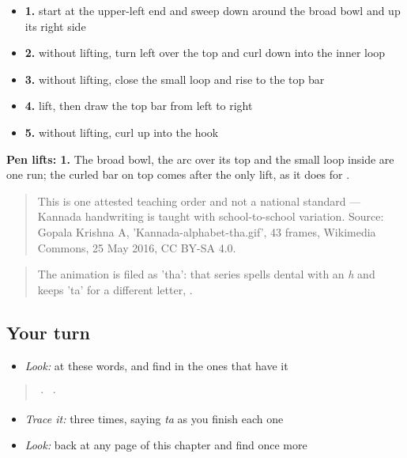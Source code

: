 \begin{itemize}
\raggedright
  \item \textbf{1.} start at the upper-left end and sweep down around the broad bowl and up its right side
  \item \textbf{2.} without lifting, turn left over the top and curl down into the inner loop
  \item \textbf{3.} without lifting, close the small loop and rise to the top bar
  \item \textbf{4.} lift, then draw the top bar from left to right
  \item \textbf{5.} without lifting, curl up into the hook
\end{itemize}

\textbf{Pen lifts: 1.} The broad bowl, the arc over its top and the small loop inside are one run; the curled bar on top comes after the only lift, as it does for .

\begin{quote}
This is one attested teaching order and not a national standard — Kannada handwriting is taught with school-to-school variation. Source: Gopala Krishna A, 'Kannada-alphabet-tha.gif', 43 frames, Wikimedia Commons, 25 May 2016, CC BY-SA 4.0.
\end{quote}

\begin{quote}
The animation is filed as 'tha': that series spells dental  with an \emph{h} and keeps 'ta' for a different letter, .
\end{quote}

\subsection*{Your turn}
\begin{itemize}
\raggedright
  \item \emph{Look:} at these words, and find  in the ones that have it
\end{itemize}

\begin{quote}
  ·     ·  
\end{quote}

\begin{itemize}
\raggedright
  \item \emph{Trace it:}  three times, saying \emph{ta} as you finish each one
  \item \emph{Look:} back at any page of this chapter and find  once more
\end{itemize}

